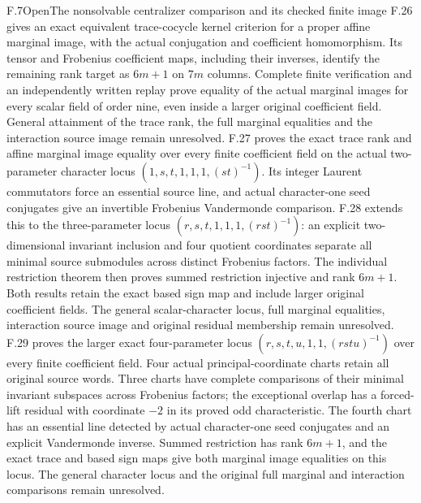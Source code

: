 \begin{claim}{F.7}{Open}{The nonsolvable centralizer comparison and its checked finite image}
F.26 gives an exact equivalent trace-cocycle kernel criterion for a proper affine marginal image, with the actual conjugation and coefficient homomorphism. Its tensor and Frobenius coefficient maps, including their inverses, identify the remaining rank target as $6m+1$ on $7m$ columns. Complete finite verification and an independently written replay prove equality of the actual marginal images for every scalar field of order nine, even inside a larger original coefficient field. General attainment of the trace rank, the full marginal equalities and the interaction source image remain unresolved.
F.27 proves the exact trace rank and affine marginal image equality over every finite coefficient field on the actual two-parameter character locus $(1,s,t,1,1,1,(st)^{-1})$. Its integer Laurent commutators force an essential source line, and actual character-one seed conjugates give an invertible Frobenius Vandermonde comparison. F.28 extends this to the three-parameter locus $(r,s,t,1,1,1,(rst)^{-1})$: an explicit two-dimensional invariant inclusion and four quotient coordinates separate all minimal source submodules across distinct Frobenius factors. The individual restriction theorem then proves summed restriction injective and rank $6m+1$. Both results retain the exact based sign map and include larger original coefficient fields. The general scalar-character locus, full marginal equalities, interaction source image and original residual membership remain unresolved.
F.29 proves the larger exact four-parameter locus
$(r,s,t,u,1,1,(rstu)^{-1})$ over every finite coefficient field.
Four actual principal-coordinate charts retain all original source words.
Three charts have complete comparisons of their minimal invariant
subspaces across Frobenius factors; the exceptional overlap has a
forced-lift residual with coordinate $-2$ in its proved odd
characteristic. The fourth chart has an essential line detected by
actual character-one seed conjugates and an explicit Vandermonde
inverse. Summed restriction has rank $6m+1$, and the exact trace
and based sign maps give both marginal image equalities on this locus.
The general character locus and the original full marginal and
interaction comparisons remain unresolved.
\end{claim}
